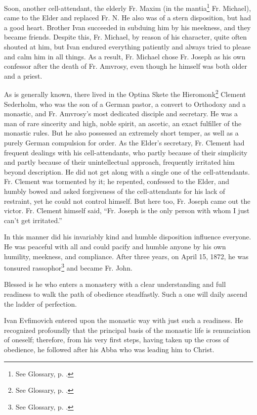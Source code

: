 Soon, another cell-attendant, the elderly Fr. Maxim (in the mantia\footnote{See Glossary, p. \pageref{mantia}.} Fr. Michael), came to the Elder and replaced Fr. N. He also was of a stern disposition, but had a good heart. Brother Ivan succeeded in subduing him by his meekness, and they became friends. Despite this, Fr. Michael, by reason of his character, quite often shouted at him, but Ivan endured everything patiently and always tried to please and calm him in all things. As a result, Fr. Michael chose Fr. Joseph as his own confessor after the death of Fr. Amvrosy, even though he himself was both older and a priest.

As is generally known, there lived in the Optina Skete the Hieromonk\footnote{See Glossary, p. \pageref{hieromonk}.} Clement Sederholm, who was the son of a German pastor, a convert to Orthodoxy and a monastic, and Fr. Amvrosy's most dedicated disciple and secretary. He was a man of rare sincerity and high, noble spirit, an ascetic, an exact fulfiller of the monastic rules. But he also possessed an extremely short temper, as well as a purely German compulsion for order. As the Elder's secretary, Fr. Clement had frequent dealings with his cell-attendants, who partly because of their simplicity and partly because of their unintellectual approach, frequently irritated him beyond description. He did not get along with a single one of the cell-attendants. Fr. Clement was tormented by it; he repented, confessed to the Elder, and humbly bowed and asked forgiveness of the cell-attendants for his lack of restraint, yet he could not control himself. But here too, Fr. Joseph came out the victor. Fr. Clement himself said, ``Fr. Joseph is the only person with whom I just can't get irritated.''

In this manner did his invariably kind and humble disposition influence everyone. He was peaceful with all and could pacify and humble anyone by his own humility, meekness, and compliance. After three years, on April 15, 1872, he was tonsured rassophor\footnote{See Glossary, p. \pageref{rassophor}.} and became Fr. John.

Blessed is he who enters a monastery with a clear understanding and full readiness to walk the path of obedience steadfastly. Such a one will daily ascend the ladder of perfection.

Ivan Evfimovich entered upon the monastic way with just such a readiness. He recognized profoundly that the principal basis of the monastic life is renunciation of oneself; therefore, from his very first steps, having taken up the cross of obedience, he followed after his Abba who was leading him to Christ.

